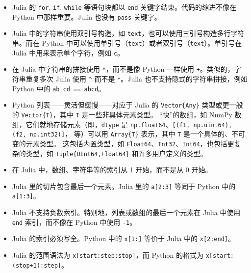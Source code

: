 \begin{itemize}
\item Julia 的 \texttt{for}, \texttt{if}, \texttt{while} 等语句块都以 \texttt{end} 关键字结束。代码的缩进不像在 Python 中那样重要。Julia 也没有 \texttt{pass} 关键字。


\item Julia 中的字符串使用双引号构造，如 \texttt{{\textquotedbl}text{\textquotedbl}}，也可以使用三引号构造多行字符串。而在 Python 中可以使用单引号（\texttt{{\textquotesingle}text{\textquotesingle}}）或者双引号（\texttt{{\textquotedbl}text{\textquotedbl}}）。单引号在 Julia 中用来表示单个字符，例如 \texttt{{\textquotesingle}c{\textquotesingle}}。


\item 在 Julia 中字符串的拼接使用 \texttt{*}，而不是像 Python 一样使用 \texttt{+}。类似的，字符串重复多次 Julia 使用 \texttt{{\textasciicircum}} 而不是 \texttt{*}。Julia 也不支持隐式的字符串拼接，例如 Python 中的 \texttt{{\textquotesingle}ab{\textquotesingle} {\textquotesingle}cd{\textquotesingle} == {\textquotesingle}abcd{\textquotesingle}}。


\item Python 列表——灵活但缓慢——对应于 Julia 的 \texttt{Vector\{Any\}} 类型或更一般的 \texttt{Vector\{T\}}，其中 \texttt{T} 是一些非具体元素类型。 “快”的数组，如 NumPy 数组，它们就地存储元素（即，\texttt{dtype} 是 \texttt{np.float64}、\texttt{[({\textquotesingle}f1{\textquotesingle}, np.uint64), ({\textquotesingle}f2{\textquotesingle}, np.int32)]}， 等）可以用 \texttt{Array\{T\}} 表示，其中 \texttt{T} 是一个具体的、不可变的元素类型。 这包括内置类型，如 \texttt{Float64}、\texttt{Int32}、\texttt{Int64}，也包括更复杂的类型，如 \texttt{Tuple\{UInt64,Float64\}} 和许多用户定义的类型。


\item 在 Julia 中，数组、字符串等的索引从 1 开始，而不是从 0 开始。


\item Julia 里的切片包含最后一个元素。Julia 里的 \texttt{a[2:3]} 等同于 Python 中的 \texttt{a[1:3]}。


\item Julia 不支持负数索引。特别地，列表或数组的最后一个元素在 Julia 中使用 \texttt{end} 索引，而不像在 Python 中使用 \texttt{-1}。


\item Julia 的索引必须写全。Python 中的 \texttt{x[1:]} 等价于 Julia 中的 \texttt{x[2:end]}。


\item Julia 的范围语法为 \texttt{x[start:step:stop]}，而 Python 的格式为 \texttt{x[start:(stop+1):step]}。

\end{itemize}


